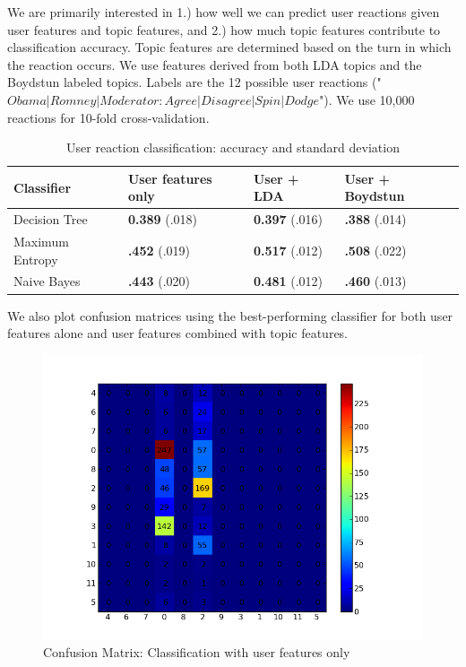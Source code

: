 \documentclass[12pt]{article}
\begin{document}
We are primarily interested in 1.) how well we can predict user reactions given user features and topic features, and 2.) how much topic features contribute to classification accuracy. Topic features are determined based on the turn in which the reaction occurs. We use features derived from both LDA topics and the Boydstun labeled topics. Labels are the 12 possible user reactions ("$Obama|Romney|Moderator : Agree|Disagree|Spin|Dodge$"). We use 10,000 reactions for 10-fold cross-validation.

\begin{table}[H]
\begin{centering}
\begin{tabular}{ l | l | l | l }
Classifier & User features only & User + LDA & User + Boydstun \\
\hline
Decision Tree & \textbf{0.389} (.018) & \textbf{0.397} (.016) &  \textbf{.388} (.014) \\
Maximum Entropy & \textbf{.452} (.019) & \textbf{0.517} (.012) &  \textbf{.508} (.022) \\
Naive Bayes & \textbf{.443} (.020) & \textbf{0.481} (.012) &  \textbf{.460} (.013) \\
\end{tabular}
\caption{User reaction classification: accuracy and standard deviation}
\end{centering}
\end{table}

We also plot confusion matrices using the best-performing classifier for both user features alone and user features combined with topic features.

\begin{figure}[H]
	\centering
	\includegraphics[scale=0.5]{Figures/no_topic_features_confusion.png}
	\caption{Confusion Matrix: Classification with user features only}
	\label{fig:useronlyconfusion}
\end{figure}
\end{document}
